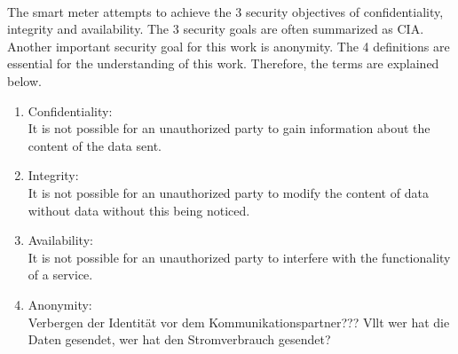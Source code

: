 \\
The smart meter attempts to achieve the 3 security objectives of confidentiality, integrity and availability. The 3 security goals are often summarized as CIA. Another important security goal for this work is anonymity. The 4 definitions are essential for the understanding of this work. Therefore, the terms are explained below.
\begin{enumerate}
\item Confidentiality: \\
It is not possible for an unauthorized party to gain information about the content of the data sent.
\item Integrity:\\
It is not possible for an unauthorized party to modify the content of data without data without this being noticed.
\item Availability: \\
It is not possible for an unauthorized party to interfere with the functionality of a service.
\item Anonymity:\\
Verbergen der Identität vor dem Kommunikationspartner???
Vllt wer hat die Daten gesendet, wer hat den Stromverbrauch gesendet?
\end{enumerate}
 

